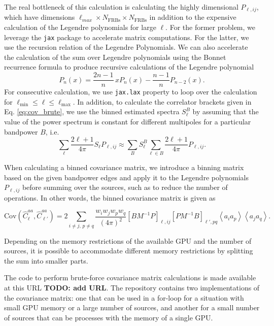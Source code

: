 \documentclass[aps,twocolumn, superscriptaddress, english, nofootinbib, 10pt]{revtex4-2}
\newcommand{\todo}[1]{{\color{blue}\bf TODO: #1}}
\begin{document}
The real bottleneck of this calculation is calculating the highly dimensional $P_{\ell, ij}$, which have dimensions $\ell_{max} \times N_{\text{FRBs}} \times N_{\text{FRBs}}$ in addition to the expensive calculation of the Legendre polynomials for large $\ell$. For the former problem, we leverage the \texttt{jax} package to accelerate matrix computations. For the latter, we use the recursion relation of the Legendre Polynomials. We can also accelerate the calculation of the sum over Legendre polynomials using the Bonnet recurrence formula  to produce recursive calculations of the Legendre polynomial \citep{Hademenos_Spiegel_Liu_2001}
\begin{equation}
    P_{n}(x) = \frac{2n-1}{n} \, x P_n(x) - \frac{n - 1}{n} P_{n-2}(x).
\end{equation}
For consecutive calculation, we use \texttt{jax.lax} property to loop over the calculation for $\ell_\mathrm{min} \leq \ell \leq \ell_\mathrm{max}$. In addition, to calculate the correlator brackets given in Eq. \ref{eq:cov_brute}, we use the binned estimated spectra $S^B_\ell$ by assuming that the value of the power spectrum is constant for different multipoles for a particular bandpower $B$, i.e.
\begin{equation}
    \sum_{\ell} \frac{2\ell+1}{4\pi} S_\ell P_{\ell,ij}  \approx \sum_{B} S^B_\ell  \sum_{\ell \in B} \frac{2\ell+1}{4\pi}  P_{\ell,ij}.
\end{equation}

When calculating  a binned covariance matrix, we introduce a binning matrix based on the given bandpower edges and apply it to the Legendre polynomials $P_{\ell, ij}$ before summing over the sources, such as to reduce the number of operations. In other words, the binned covariance matrix is given as

\begin{equation}
    \mathrm{Cov}(\hat{C}_\ell^{aa}, \hat{C}_{\ell'}^{aa})  =  2
    \sum_{i \not= j,\, p \not= q}\frac{w_i w_jw_p w_q}{(4\pi)^2}   [BM^{-1}P]_{\ell, ij} [PM^{-1}B]_{\ell', pq}
     \left\langle a_i a_p \right\rangle \left\langle a_j a_q \right\rangle.
\end{equation}

Depending on the memory restrictions of the available GPU and the number of sources, it is possible to accommodate different memory restrictions by splitting the sum into smaller parts. 

The code to perform brute-force covariance matrix calculations is made available at this URL \todo{add URL}. The repository contains two implementations of the covariance matrix: one that can be used in a for-loop for a situation with small GPU memory or a large number of sources, and another for a small number of sources that can be processes with the memory of a single GPU. 
\end{document}
